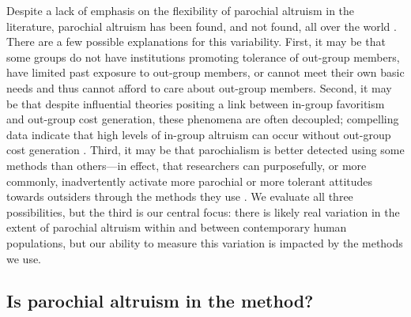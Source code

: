 \documentclass[bibauthoryear]{aa}
\begin{document}
Despite a lack of emphasis on the flexibility of parochial altruism in the literature, parochial altruism has been found, and not found, all over the world \citep{Rusch2014, Baldassarri1183}. There are a few possible explanations for this variability. First, it may be that some groups do not have institutions promoting tolerance of out-group members, have limited past exposure to out-group members, or cannot meet their own basic needs and thus cannot afford to care about out-group members. Second, it may be that despite influential theories positing a link between in-group favoritism and out-group cost generation, these phenomena are often decoupled; compelling data indicate that high levels of in-group altruism can occur without out-group cost generation \citep{purzycki2019identity, hruschka2013economic, yamagishi2016parochial, brewer2006evolutionary, schaub2017threat, cashdan2001ethnocentrism, Rusch2014}. Third, it may be that parochialism is better detected using some methods than others---in effect, that researchers can purposefully, or more commonly, inadvertently activate more parochial or more tolerant attitudes towards outsiders through the methods they use \citep{Pisor2020}. We evaluate all three possibilities, but the third is our central focus: there is likely real variation in the extent of parochial altruism within and between contemporary human populations, but our ability to measure this variation is impacted by the methods we use.

\subsection{Is parochial altruism in the method?}\label{inthemethod}
\end{document}
